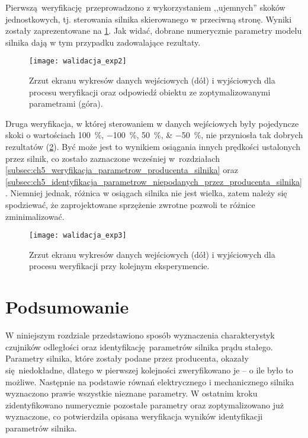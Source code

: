Pierwszą weryfikację przeprowadzono z wykorzystaniem ,,ujemnych'' skoków jednostkowych, tj. sterowania silnika skierowanego w przeciwną stronę. Wyniki zostały zaprezentowane na \cref{fig:silnik_weryfikacja_parametrow}. Jak widać, dobrane numerycznie parametry modelu silnika dają w tym przypadku zadowalające rezultaty.

\begin{figure}[h]
    \centering
    \texttt{[image: walidacja\_exp2]}
    \caption{Zrzut ekranu wykresów danych wejściowych (dół) i wyjściowych dla procesu weryfikacji oraz odpowiedź obiektu ze zoptymalizowanymi parametrami (góra).}
    \label{fig:silnik_weryfikacja_parametrow}
\end{figure}

Druga weryfikacja, w której sterowaniem w danych wejściowych były pojedyncze skoki o wartościach \SIlist{100;-100;50;-50}{\percent}, nie przyniosła tak dobrych rezultatów (\cref{fig:silnik_nieudana_weryfikacja_parametrow}). Być może jest to wynikiem osiągania innych prędkości ustalonych przez silnik, co zostało zaznaczone wcześniej w~rozdziałach \ref{subsec:ch5_weryfikacja_parametrow_producenta_silnika} oraz \ref{subsec:ch5_identyfikacja_parametrow_niepodanych_przez_producenta_silnika}. Niemniej jednak, różnica w osiągach silnika nie jest wielka, zatem należy się spodziewać, że zaprojektowane sprzężenie zwrotne pozwoli te różnice zminimalizować.

\begin{figure}[h]
    \centering
    \texttt{[image: walidacja\_exp3]}
    \caption{Zrzut ekranu wykresów danych wejściowych (dół) i wyjściowych dla procesu weryfikacji przy kolejnym eksperymencie.}
    \label{fig:silnik_nieudana_weryfikacja_parametrow}
\end{figure}



\section{Podsumowanie}

W niniejszym rozdziale przedstawiono sposób wyznaczenia charakterystyk czujników odległości oraz identyfikację parametrów silnika prądu stałego. Parametry silnika, które zostały podane przez producenta, okazały się niedokładne, dlatego w pierwszej kolejności zweryfikowano je -- o ile było to możliwe. Następnie na podstawie równań elektrycznego i mechanicznego silnika wyznaczono prawie wszystkie nieznane parametry. W ostatnim kroku zidentyfikowano numerycznie pozostałe parametry oraz zoptymalizowano już wyznaczone, co potwierdziła opisana weryfikacja wyników identyfikacji parametrów silnika.

